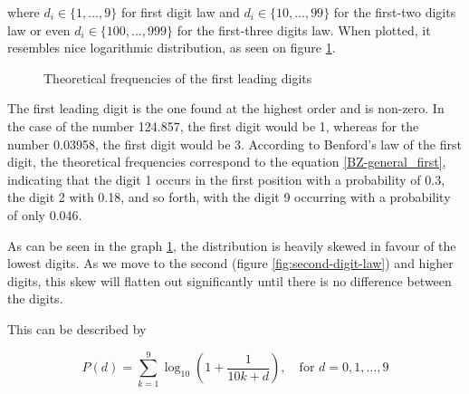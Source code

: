 where $d_i \in \{1,\dots,9\}$ for first digit law and $d_i \in \{10,\dots,99\}$ for the first-two digits law or even $d_i \in \{100,\dots,999\}$ for the first-three digits law. When plotted, it resembles nice logarithmic distribution, as seen on figure \ref{fig:FL}.  \cite{Cerqueti2202,Hronova2023,Newcomb1881}

\begin{figure}[h]
    \centering
    \caption{Theoretical frequencies of the first leading digits}
    \label{fig:FL}
    \pgfplotsset{width=8.5cm,compat=1.18}
\end{figure}

The first leading digit is the one found at the highest order and is non-zero. In the case of the number 124.857, the first digit would be 1, whereas for the number 0.03958, the first digit would be 3. According to Benford's law of the first digit, the theoretical frequencies correspond to the equation \ref{BZ-general_first}, indicating that the digit 1 occurs in the first position with a probability of 0.3, the digit 2 with 0.18, and so forth, with the digit 9 occurring with a probability of only 0.046.

As can be seen in the graph \ref{fig:FL}, the distribution is heavily skewed in favour of the lowest digits. As we move to the second (figure \ref{fig:second-digit-law}) and higher digits, this skew will flatten out significantly until there is no difference between the digits.  \cite{kossovsky2014benford}

This can be described by 

\begin{equation}
    \label{BZ-general_second}
    P(d) = \sum\limits_{k=1}^{9} \log_{10}\left( 1+\frac{1}{10k+d}\right), \quad \text{for } d = 0,1,\dots,9
\end{equation}

